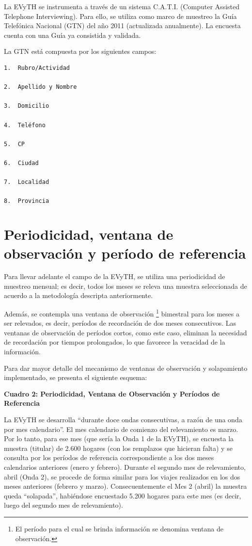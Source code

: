 \documentclass[
  openany]{book}
\begin{document}
La EVyTH se instrumenta a través de un sistema C.A.T.I. (Computer Assisted Telephone Interviewing). Para ello, se utiliza como marco de muestreo la Guía Telefónica Nacional (GTN) del año 2011 (actualizada anualmente). La encuesta cuenta con una Guía ya consistida y validada.

La GTN está compuesta por los siguientes campos:

\begin{verbatim}
1.  Rubro/Actividad

2.  Apellido y Nombre

3.  Domicilio

4.  Teléfono

5.  CP

6.  Ciudad

7.  Localidad

8.  Provincia
\end{verbatim}

\hypertarget{periodicidad-ventana-de-observaciuxf3n-y-peruxedodo-de-referencia}{%
\section{Periodicidad, ventana de observación y período de referencia}\label{periodicidad-ventana-de-observaciuxf3n-y-peruxedodo-de-referencia}}

Para llevar adelante el campo de la EVyTH, se utiliza una periodicidad de muestreo mensual; es decir, todos los meses se releva una muestra seleccionada de acuerdo a la metodología descripta anteriormente.

Además, se contempla una ventana de observación \footnote{El período para el cual se brinda información se denomina ventana de observación.} bimestral para los meses a ser relevados, es decir, períodos de recordación de dos meses consecutivos. Las ventanas de observación de períodos cortos, como este caso, eliminan la necesidad de recordación por tiempos prolongados, lo que favorece la veracidad de la información.

Para dar mayor detalle del mecanismo de ventanas de observación y solapamiento implementado, se presenta el siguiente esquema:

\textbf{Cuadro 2: Periodicidad, Ventana de Observación y Períodos de Referencia}

La EVyTH se desarrolla ``durante doce ondas consecutivas, a razón de una onda por mes calendario''. El mes calendario de comienzo del relevamiento es marzo. Por lo tanto, para ese mes (que sería la Onda 1 de la EVyTH), se encuesta la muestra (titular) de 2.600 hogares (con los remplazos que hicieran falta) y se consulta por los períodos de referencia correspondiente a los dos meses calendarios anteriores (enero y febrero). Durante el segundo mes de relevamiento, abril (Onda 2), se procede de forma similar para los viajes realizados en los dos meses anteriores (febrero y marzo). Consecuentemente el Mes 2 (abril) la muestra queda ``solapada'', habiéndose encuestado 5.200 hogares para este mes (es decir, luego del segundo mes de relevamiento).
\end{document}
